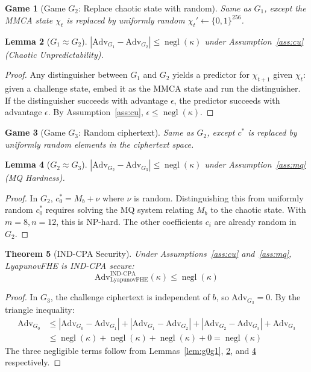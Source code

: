 \documentclass[11pt,a4paper]{article}
\newtheorem{theorem}{Theorem}[section]
\newtheorem{lemma}[theorem]{Lemma}
\newtheorem{game}[theorem]{Game}
\DeclareMathOperator{\negl}{negl}
\begin{document}
\begin{game}[Game $G_2$: Replace chaotic state with random]
\label{game:g2}
Same as $G_1$, except the MMCA state $\chi_t$ is replaced by uniformly random $\chi_t' \leftarrow \{0,1\}^{256}$.
\end{game}

\begin{lemma}[$G_1 \approx G_2$]
\label{lem:g1g2}
$|\text{Adv}_{G_1} - \text{Adv}_{G_2}| \leq \negl(\kappa)$ under Assumption~\ref{ass:cu} (Chaotic Unpredictability).
\end{lemma}

\begin{proof}
Any distinguisher between $G_1$ and $G_2$ yields a predictor for $\chi_{t+1}$ given $\chi_t$: given a challenge state, embed it as the MMCA state and run the distinguisher. If the distinguisher succeeds with advantage $\epsilon$, the predictor succeeds with advantage $\epsilon$. By Assumption~\ref{ass:cu}, $\epsilon \leq \negl(\kappa)$.
\end{proof}

\begin{game}[Game $G_3$: Random ciphertext]
\label{game:g3}
Same as $G_2$, except $c^*$ is replaced by uniformly random elements in the ciphertext space.
\end{game}

\begin{lemma}[$G_2 \approx G_3$]
\label{lem:g2g3}
$|\text{Adv}_{G_2} - \text{Adv}_{G_3}| \leq \negl(\kappa)$ under Assumption~\ref{ass:mq} (MQ Hardness).
\end{lemma}

\begin{proof}
In $G_2$, $c^*_0 = M_b + \nu$ where $\nu$ is random. Distinguishing this from uniformly random $c^*_0$ requires solving the MQ system relating $M_b$ to the chaotic state. With $m=8, n=12$, this is NP-hard. The other coefficients $c_i$ are already random in $G_2$.
\end{proof}

\begin{theorem}[IND-CPA Security]
\label{thm:indcpa}
Under Assumptions~\ref{ass:cu} and~\ref{ass:mq}, LyapunovFHE is IND-CPA secure:
\[
\text{Adv}_{\text{LyapunovFHE}}^{\text{IND-CPA}}(\kappa) \leq \negl(\kappa)
\]
\end{theorem}

\begin{proof}
In $G_3$, the challenge ciphertext is independent of $b$, so $\text{Adv}_{G_3} = 0$. By the triangle inequality:
\begin{align*}
\text{Adv}_{G_0} &\leq |\text{Adv}_{G_0} - \text{Adv}_{G_1}| + |\text{Adv}_{G_1} - \text{Adv}_{G_2}| + |\text{Adv}_{G_2} - \text{Adv}_{G_3}| + \text{Adv}_{G_3} \\
&\leq \negl(\kappa) + \negl(\kappa) + \negl(\kappa) + 0 = \negl(\kappa)
\end{align*}
The three negligible terms follow from Lemmas~\ref{lem:g0g1}, \ref{lem:g1g2}, and \ref{lem:g2g3} respectively.
\end{proof}
\end{document}
